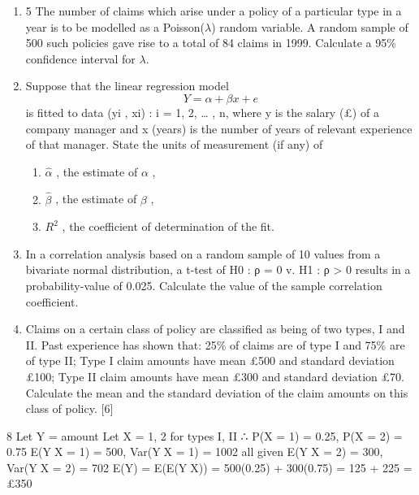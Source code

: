 \documentclass[a4paper,12pt]{article}
\begin{document}
\begin{enumerate}
\item 5 The number of claims which arise under a policy of a particular type in a year is
to be modelled as a Poisson($\lambda$) random variable. A random sample of 500 such policies gave rise to a total of 84 claims in 1999.
Calculate a 95\% confidence interval for $\lambda$. 
\item Suppose that the linear regression model
\[Y = \alpha + \beta x + e\]
is fitted to data {(yi , xi) : i = 1, 2, … , n}, where y is the salary (£) of a company
manager and x (years) is the number of years of relevant experience of that
manager.
State the units of measurement (if any) of
\begin{enumerate}
    \item  $\hat{\alpha}$ , the estimate of $\alpha$ ,
\item $\hat{\beta}$ , the estimate of $\beta$ ,
\item $R^2$ , the coefficient of determination of the fit. 
\end{enumerate}

\newpage

\item In a correlation analysis based on a random sample of 10 values from a bivariate
normal distribution, a t-test of
H0 : ρ = 0 v. H1 : ρ > 0
results in a probability-value of 0.025.
Calculate the value of the sample correlation coefficient. 
\newpage
\item  Claims on a certain class of policy are classified as being of two types, I and II.
Past experience has shown that:
25\% of claims are of type I and 75\% are of type II;
Type I claim amounts have mean £500 and standard deviation £100;
Type II claim amounts have mean £300 and standard deviation £70.
Calculate the mean and the standard deviation of the claim amounts on this
class of policy. [6]
\end{enumerate}


8 Let Y = amount
Let X = 1, 2 for types I, II
∴ P(X = 1) = 0.25, P(X = 2) = 0.75
E(YX = 1) = 500, Var(YX = 1) = 1002
all given
E(YX = 2) = 300, Var(YX = 2) = 702
E(Y) = E(E(YX)) = 500(0.25) + 300(0.75)
= 125 + 225 = £350
\end{document}
